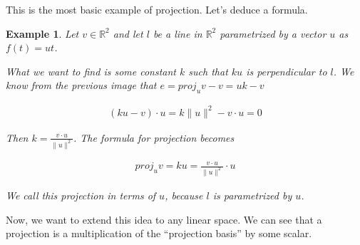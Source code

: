 \documentclass{book}
\newtheorem{example}{Example}[chapter]
\begin{document}
This is the most basic example of projection. Let's deduce a formula.

\begin{example}
    Let $v\in\mathbb{R}^{2}$ and let $l$ be a line
    in $\mathbb{R}^{2}$ parametrized by a vector $u$ as $f(t)=ut$.

    \begin{center}
    \end{center}

    What we want to find is some constant $k$ such that $ku$ is perpendicular to
    $l$. We know from the previous image that $e=proj_u v - v = uk-v$

    \begin{equation*}
        \begin{split}
            (ku-v)\cdot u = k\|u\|^{2} - v\cdot u = 0
        \end{split}
    \end{equation*}

    Then $k=\frac{v\cdot u}{\|u\|^{2}}$. The formula for projection becomes

    \begin{equation}
        \begin{split}
            proj_u v = ku = \frac{v\cdot u}{\|u\|^{2}}\cdot u
        \end{split}
    \end{equation}

    We call this projection in terms of $u$, because $l$ is parametrized by $u$.
\end{example}

Now, we want to extend this idea to any linear space. We can see that a
projection is a multiplication of the ``projection basis'' by some scalar.
\end{document}
